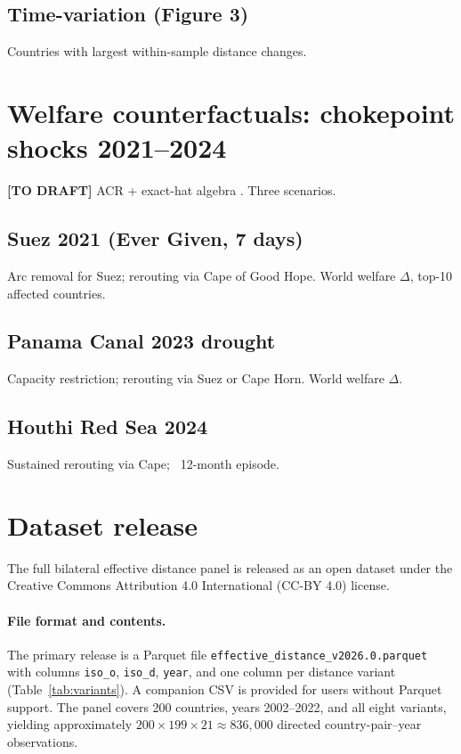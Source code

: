 \documentclass[11pt, a4paper]{article}
\begin{document}
\subsection{Time-variation (Figure 3)}
Countries with largest within-sample distance changes.

\section{Welfare counterfactuals: chokepoint shocks 2021--2024}
\label{sec:cf}

\textbf{[TO DRAFT]} ACR \citep{arkolakis_costinot_rodriguezclare_2012} + exact-hat algebra \citep{caliendo_parro_2015}. Three scenarios.

\subsection{Suez 2021 (Ever Given, 7 days)}
Arc removal for Suez; rerouting via Cape of Good Hope. World welfare $\Delta$, top-10 affected countries.

\subsection{Panama Canal 2023 drought}
Capacity restriction; rerouting via Suez or Cape Horn. World welfare $\Delta$.

\subsection{Houthi Red Sea 2024}
Sustained rerouting via Cape; ~12-month episode.

\section{Dataset release}
\label{sec:dataset}

The full bilateral effective distance panel is released as an open dataset under
the Creative Commons Attribution 4.0 International (CC-BY 4.0) license.

\paragraph{File format and contents.}
The primary release is a Parquet file \texttt{effective\_distance\_v2026.0.parquet}
with columns \texttt{iso\_o}, \texttt{iso\_d}, \texttt{year}, and one column
per distance variant (Table~\ref{tab:variants}).  A companion CSV is provided
for users without Parquet support.  The panel covers 200 countries, years
2002--2022, and all eight variants, yielding approximately $200 \times 199 \times
21 \approx 836{,}000$ directed country-pair--year observations.
\end{document}
